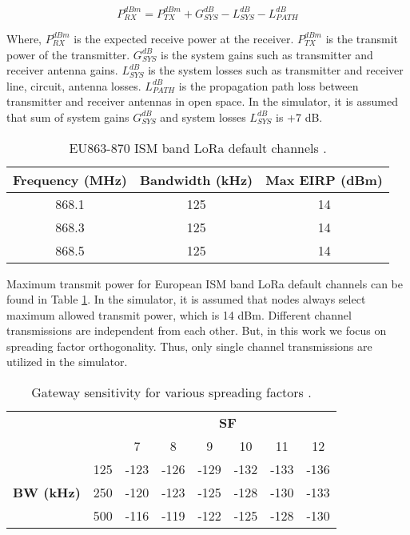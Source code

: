 \begin{equation} \label{eq:expected_rx_power}
P^{dBm}_{RX} = P^{dBm}_{TX} + G^{dB}_{SYS} - L^{dB}_{SYS} - L^{dB}_{PATH}
\end{equation}

Where, $P^{dBm}_{RX}$ is the expected receive power at the receiver. $P^{dBm}_{TX}$ is the transmit power of the transmitter. $G^{dB}_{SYS}$ is the system gains such as transmitter and receiver antenna gains. $L^{dB}_{SYS}$ is the system losses such as transmitter and receiver line, circuit, antenna losses. $L^{dB}_{PATH}$ is the propagation path loss between transmitter and receiver antennas in open space. In the simulator, it is assumed that sum of system gains $G^{dB}_{SYS}$ and system losses $L^{dB}_{SYS}$ is +7 dB.

\begin{table}
\centering
\caption{EU863-870 ISM band LoRa default channels \cite{lorawan.regional.parameters}.}
\label{table:max_tx_power}
\begin{tabular}{|c|c|c|}
\hline
\textbf{Frequency (MHz)} & \textbf{Bandwidth (kHz)} & \textbf{Max EIRP (dBm)} \\ \hline
      868.1 &   125 &   14 \\ \hline
      868.3 &   125 &   14 \\ \hline
      868.5 &   125 &   14 \\ \hline
\end{tabular}
\end{table}

Maximum transmit power for European ISM band LoRa default channels can be found in Table \ref{table:max_tx_power}. In the simulator, it is assumed that nodes always select maximum allowed transmit power, which is 14 dBm. Different channel transmissions are independent from each other. But, in this work we focus on spreading factor orthogonality. Thus, only single channel transmissions are utilized in the simulator.

\begin{table}
\centering
\caption{Gateway sensitivity for various spreading factors \cite{SX1276}.}
\label{table:gw_sf_sensitivity}
\begin{tabular}{|c|c|c|c|c|c|c|c|}
\hline
\multicolumn{2}{|c|}{\multirow{2}{*}{}} & \multicolumn{6}{c|}{\textbf{SF}} \\ \cline{3-8}
\multicolumn{2}{|c|}{}                  &    7 &    8 &    9 &   10 &   11 &   12 \\ \hline
\multirow{3}{*}{\textbf{BW (kHz)}}  & 125 & -123 & -126 & -129 & -132 & -133 & -136 \\ \cline{2-8}
                                    & 250 & -120 & -123 & -125 & -128 & -130 & -133 \\ \cline{2-8}
                                    & 500 & -116 & -119 & -122 & -125 & -128 & -130 \\ \hline
\end{tabular}
\end{table}

